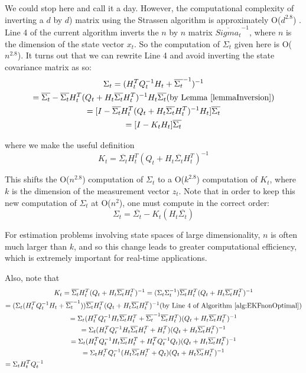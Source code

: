 We could stop here and call it a day. However, the computational complexity of inverting a \(d\) by \(d\)) matrix using the Strassen algorithm is approximately O(\(d^{2.8}\)) \cite{}. Line 4 of the current algorithm inverts the \(n\) by \(n\) matrix \(\overline{Sigma_t}^{-1}\), where \(n\) is the dimension of the state vector \(x_t\). So the computation of \(\Sigma_t\) given here is O(\(n^{2.8}\)). It turns out that we can rewrite Line 4 and avoid inverting the state covariance matrix as so:
\begin{multline}
\Sigma_t = (H_t^T Q_t^{-1} H_t + \overline{\Sigma_t}^{-1})^{-1} \\
= \overline{\Sigma_t} - \overline{\Sigma_t} H_t^T (Q_t + H_t \overline{\Sigma_t} H_t^T)^{-1} H_t \overline{\Sigma_t} \hfill \text{(by Lemma \ref{lemmaInversion})} \\
= [ I - \overline{\Sigma_t} H_t^T (Q_t + H_t \overline{\Sigma_t} H_t^T)^{-1} H_t ] \overline{\Sigma_t} \\
= [I - K_t H_t] \overline{\Sigma_t}
\end{multline}

where we make the useful definition 
\[
K_t = \overline{\Sigma_t} H_t^T (Q_t + H_t \overline{\Sigma_t} H_t^T)^{-1}
\]

This shifts the O(\(n^{2.8}\)) computation of \(\Sigma_t\) to a O(\(k^{2.8}\)) computation of \(K_t\), where \(k\) is the dimension of the measurement vector \(z_t\). Note that in order to keep this new computation of \(\Sigma_t\) at O(\(n^2\)), one must compute in the correct order:
\[\Sigma_t = \overline{\Sigma_t} - K_t (H_t \overline{\Sigma_t})
\]

For estimation problems involving state spaces of large dimensionality, \(n\) is often much larger than \(k\), and so this change leads to greater computational efficiency, which is extremely important for real-time applications.

Also, note that
\begin{multline}
K_t = \overline{\Sigma_t} H_t^T (Q_t + H_t \overline{\Sigma_t} H_t^T)^{-1} = (\Sigma_t \Sigma_t^{-1}) \overline{\Sigma_t} H_t^T (Q_t + H_t \overline{\Sigma_t} H_t^T)^{-1} \\
= (\Sigma_t (H_t^T Q_t^{-1} H_t + \overline{\Sigma_t}^{-1})) \overline{\Sigma_t} H_t^T (Q_t + H_t \overline{\Sigma_t} H_t^T)^{-1} \hfill \text{(by Line 4 of Algorithm \ref{alg:EKFnonOptimal})} \\
= \Sigma_t (H_t^T Q_t^{-1} H_t \overline{\Sigma_t} H_t^T + \overline{\Sigma_t}^{-1} \overline{\Sigma_t} H_t^T) (Q_t + H_t \overline{\Sigma_t} H_t^T)^{-1} \\
= \Sigma_t (H_t^T Q_t^{-1} H_t \overline{\Sigma_t} H_t^T + H_t^T) (Q_t + H_t \overline{\Sigma_t} H_t^T)^{-1} \\
= \Sigma_t (H_t^T Q_t^{-1} H_t \overline{\Sigma_t} H_t^T + H_t^T Q_t^{-1} Q_t) (Q_t + H_t \overline{\Sigma_t} H_t^T)^{-1} \\
= \Sigma_t H_t^T Q_t^{-1} ( H_t \overline{\Sigma_t} H_t^T + Q_t) (Q_t + H_t \overline{\Sigma_t} H_t^T)^{-1} \\
= \Sigma_t H_t^T Q_t^{-1} \hfill
\end{multline}

